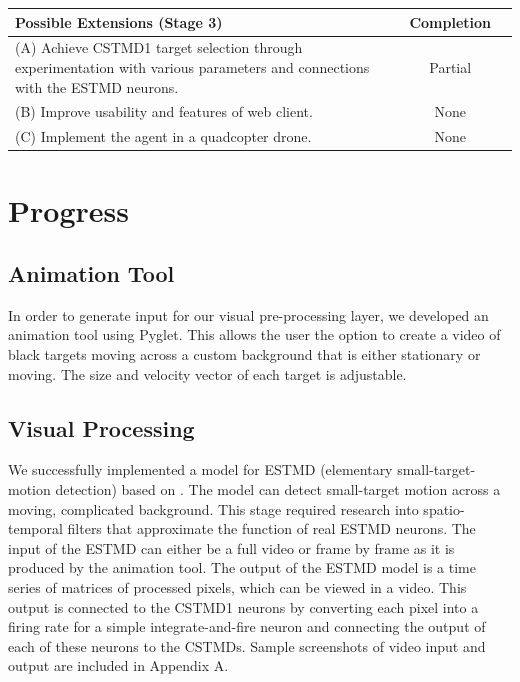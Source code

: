 \documentclass[a4paper,11pt]{article}
\begin{document}
\begin{center}
    \begin{tabular}{p{12cm} c c}
    \textbf{Possible Extensions (Stage 3)} & \textbf{Completion} \\ \hline
	(A) Achieve CSTMD1 target selection through experimentation with various parameters and connections with the ESTMD neurons. & Partial\\
	(B) Improve usability and features of web client. & None\\
	(C) Implement the agent in a quadcopter drone. & None\\
    \end{tabular}
\end{center}


\section{Progress}

\subsection{Animation Tool}
In order to generate input for our visual pre-processing layer, we developed an animation tool using Pyglet. This allows the user the option to create a video of black targets moving across a custom background that is either stationary or moving. The size and velocity vector of each target is adjustable.

\subsection{Visual Processing}
We successfully implemented a model for ESTMD (elementary small-target-motion detection) based on \cite{hal11}. The model can detect small-target motion across a moving, complicated background. This stage required research into spatio-temporal filters that approximate the function of real ESTMD neurons. The input of the ESTMD can either be a full video or frame by frame as it is produced by the animation tool. The output of the ESTMD model is a time series of matrices of processed pixels, which can be viewed in a video. This output is connected to the CSTMD1 neurons by converting each pixel into a firing rate for a simple integrate-and-fire neuron and connecting the output of each of these neurons to the CSTMDs. Sample screenshots of video input and output are included in Appendix A.
\end{document}
